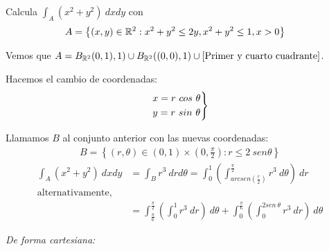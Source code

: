             \begin{ejer}
                Calcula $\int_A (x^2 + y^2) \ dxdy $ con
                \begin{align*}
                    A &= \left\{ (x,y) \in \mathbb{R}^2 : x^2 + y^2 \leq 2y, x^2 + y^2 \leq 1, x > 0 \right\}
                \end{align*}
            \end{ejer}

            \begin{sol}
                Vemos que $A = B_{\mathbb{R}^2} (0,1),1) \cup B_{\mathbb{R}^2} ((0,0),1) \cup \lbrack\text{Primer y cuarto cuadrante}\rbrack$.

                Hacemos el cambio de coordenadas: $$ \begin{rcases}
                    x = r \ cos \ \theta \\
                    y = r \ sin \ \theta
                \end{rcases}$$

                Llamamos $B$ al conjunto anterior con las nuevas coordenadas:
                \begin{align*}
                    \label{}
                    B = \left\{ (r, \theta) \in (0,1) \times (0, \frac{\pi}{2}) : r \leq 2 \ sen \theta \right\}
                \end{align*}
                \begin{align*}
                    \label{}
                    \int_A (x^2 + y^2) \ dxdy &= \int_B r^3 \ drd\theta = \int_0^1 \left( \int_{arcsen(\frac{r}{2})}^{\frac{\pi}{2}} r^3 \ d\theta \right) \ dr \\
                    \text{alternativamente,} \\
                    &= \int_{\frac{\pi}{6}}^{\frac{\pi}{2}} \left( \int_0^1 r^3 \ dr \right) \ d\theta + \int_0^{\frac{\pi}{6}} \left( \int_0^{2sen \ \theta} r^3 \ dr \right) \ d\theta
                \end{align*}


                {\sffamily \textit{De forma cartesiana:}}


\end{sol}

